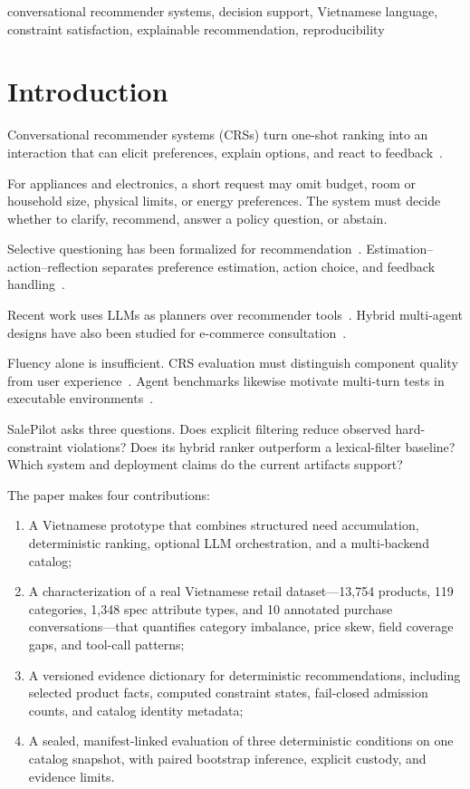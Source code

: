 \documentclass[conference,a4paper]{IEEEtran}
\begin{document}
\begin{IEEEkeywords}
conversational recommender systems, decision support, Vietnamese language, constraint satisfaction, explainable recommendation, reproducibility
\end{IEEEkeywords}

\section{Introduction}
Conversational recommender systems (CRSs) turn one-shot ranking into an interaction that can elicit preferences, explain options, and react to feedback~\cite{jannach2021survey}.

For appliances and electronics, a short request may omit budget, room or household size, physical limits, or energy preferences. The system must decide whether to clarify, recommend, answer a policy question, or abstain.

Selective questioning has been formalized for recommendation~\cite{christakopoulou2016towards}. Estimation--action--reflection separates preference estimation, action choice, and feedback handling~\cite{lei2020ear}.

Recent work uses LLMs as planners over recommender tools~\cite{huang2025interecagent}. Hybrid multi-agent designs have also been studied for e-commerce consultation~\cite{nie2024hybrid}.

Fluency alone is insufficient. CRS evaluation must distinguish component quality from user experience~\cite{jannach2023evaluating}. Agent benchmarks likewise motivate multi-turn tests in executable environments~\cite{liu2024agentbench}.

SalePilot asks three questions. Does explicit filtering reduce observed hard-constraint violations? Does its hybrid ranker outperform a lexical-filter baseline? Which system and deployment claims do the current artifacts support?

The paper makes four contributions:

\begin{enumerate}
\item A Vietnamese prototype that combines structured need accumulation, deterministic ranking, optional LLM orchestration, and a multi-backend catalog;

\item A characterization of a real Vietnamese retail dataset---13{,}754 products, 119 categories, 1{,}348 spec attribute types, and 10 annotated purchase conversations---that quantifies category imbalance, price skew, field coverage gaps, and tool-call patterns;

\item A versioned evidence dictionary for deterministic recommendations, including selected product facts, computed constraint states, fail-closed admission counts, and catalog identity metadata;

\item A sealed, manifest-linked evaluation of three deterministic conditions on one catalog snapshot, with paired bootstrap inference, explicit custody, and evidence limits.
\end{enumerate}
\end{document}
